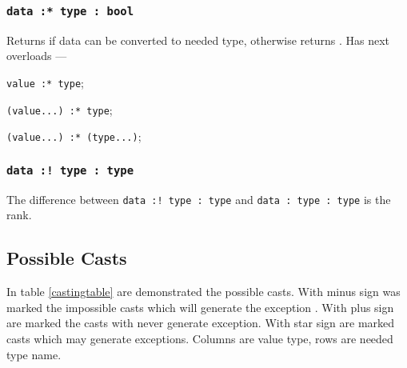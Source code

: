 \subsubsection{\texttt{data :* type : bool}}

Returns \true{} if data can be converted to needed type, otherwise returns \false. Has next overloads —
\begin{icItems}
	\item \texttt{value :* type};
	\item \texttt{(value...) :* type};
	\item \texttt{(value...) :* (type...)};
\end{icItems}

\subsubsection{\texttt{data :! type : type}}

The difference between \texttt{data :! type : type} and \texttt{data : type : type} is the rank.

\subsection{Possible Casts}

In table \ref{castingtable} are demonstrated the possible casts.
With minus sign was marked the impossible casts which will generate the exception . With plus sign are marked the casts with never generate exception. With star sign are marked casts which may generate exceptions. Columns are value type, rows are needed type name.

